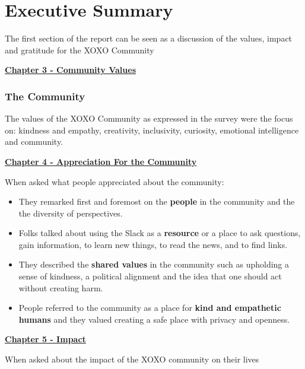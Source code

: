 \documentclass[
]{book}
\providecommand{\tightlist}{%
  \setlength{\itemsep}{0pt}\setlength{\parskip}{0pt}}
\begin{document}
\chapter{Executive Summary}\label{executive-summary}

The first section of the report can be seen as a discussion of the values, impact and gratitude for the XOXO Community

\textbf{\href{https://bduckles.github.io/XOXOReport_BD/community-values.html}{Chapter 3 - Community Values}}

\subsection{The Community}\label{the-community}

The values of the XOXO Community as expressed in the survey were the focus on: kindness and empathy, creativity, inclusivity, curiosity, emotional intelligence and community.

\textbf{\href{https://bduckles.github.io/XOXOReport_BD/appreciation-for-the-community.html}{Chapter 4 - Appreciation For the Community}}

When asked what people appreciated about the community:

\begin{itemize}
\tightlist
\item
  They remarked first and foremost on the \textbf{people} in the community and the the diversity of perspectives.
\item
  Folks talked about using the Slack as a \textbf{resource} or a place to ask questions, gain information, to learn new things, to read the news, and to find links.
\item
  They described the \textbf{shared values} in the community such as upholding a sense of kindness, a political alignment and the idea that one should act without creating harm.
\item
  People referred to the community as a place for \textbf{kind and empathetic humans} and they valued creating a safe place with privacy and openness.
\end{itemize}

\textbf{\href{https://bduckles.github.io/XOXOReport_BD/impact.html}{Chapter 5 - Impact}}

When asked about the impact of the XOXO community on their lives
\end{document}
